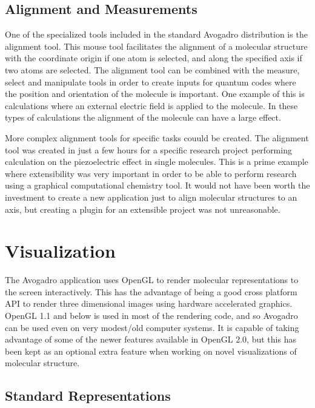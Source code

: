 \documentclass{article}
\begin{document}
\subsection{Alignment and Measurements}

One of the specialized tools included in the standard Avogadro distribution is the alignment tool. This mouse tool facilitates the alignment of a molecular structure with the coordinate origin if one atom is selected, and along the specified axis if two atoms are selected. The alignment tool can be combined with the measure, select and manipulate tools in order to create inputs for quantum codes where the position and orientation of the molecule is important. One example of this is calculations where an external electric field is applied to the molecule. In these types of calculations the alignment of the molecule can have a large effect.

More complex alignment tools for specific tasks couuld be created. The alignment tool was created in just a few hours for a specific research project performing calculation on the piezoelectric effect in single molecules. This is a prime example where extensibility was very important in order to be able to perform research using a graphical computational chemistry tool. It would not have been worth the investment to create a new application just to align molecular structures to an axis, but creating a plugin for an extensible project was not unreasonable.


\section{Visualization}

The Avogadro application uses OpenGL to render molecular representations to the screen interactively. This has the advantage of being a good cross platform API to render three dimensional images using hardware accelerated graphics. OpenGL 1.1 and below is used in most of the rendering code, and so Avogadro can be used even on very modest/old computer systems. It is capable of taking advantage of some of the newer features available in OpenGL 2.0, but this has been kept as an optional extra feature when working on novel visualizations of molecular structure.

\subsection{Standard Representations}
\end{document}
